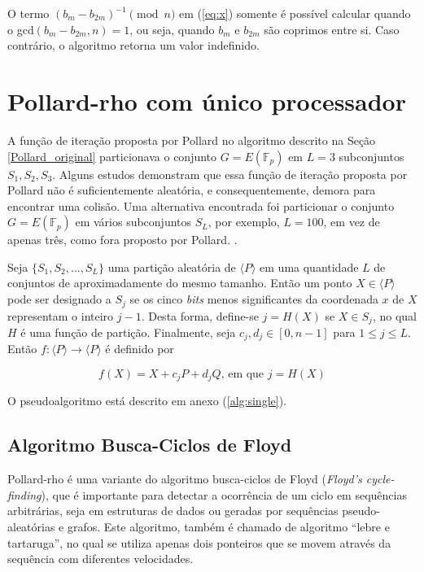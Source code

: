 O termo $(b_m - b_{2m})^{-1} \pmod n$ em (\ref{eq:x}) somente é possível calcular quando o gcd$(b_m - b_{2m}, n) = 1$, ou seja, quando \(b_m\) e \(b_{2m}\) são coprimos entre si. Caso contrário, o algoritmo retorna um valor indefinido.

%
%
\section{Pollard-rho com único processador} \label{sec:single}

A função de iteração proposta por Pollard no algoritmo descrito na Seção \ref{Pollard_original} particionava o conjunto $G = E(\mathbb{F}_p)$ em \(L = 3\) subconjuntos \(S_1, S_2, S_3\). Alguns estudos demonstram que essa função de iteração proposta por Pollard não é suficientemente aleatória, e consequentemente, demora para encontrar uma colisão. Uma alternativa encontrada foi particionar o conjunto $G = E(\mathbb{F}_p)$ em vários subconjuntos $S_L$, por exemplo, \(L = 100\), em vez de apenas três, como fora proposto por Pollard. \cite{Laporta:2014}.

Seja $\{S_1, S_2, ..., S_L\}$ uma partição aleatória de $\langle P \rangle$ em uma quantidade \(L\) de conjuntos de aproximadamente do mesmo tamanho. Então um ponto $X \in \langle P \rangle$ pode ser designado a \(S_j\) se os cinco \textit{bits} menos significantes da coordenada \(x\) de \(X\) representam o inteiro \(j-1\). Desta forma, define-se $j = H(X)$ se $X \in S_j$, no qual \(H\) é uma função de partição. Finalmente, seja $c_j, d_j \in [0, n-1]$ para $1 \leq j \leq L$. Então $f : \langle P \rangle \to  \langle P \rangle$ é definido por

\begin{equation*}
f(X) = X + c_jP + d_jQ \textrm{, em que } j = H(X)
\end{equation*}

O pseudoalgoritmo está descrito em anexo (\ref{alg:single}).

%
%
\subsection{Algoritmo Busca-Ciclos de Floyd} \label{floyd}
Pollard-rho é uma variante do algoritmo busca-ciclos de Floyd (\textit{Floyd's cycle-finding}), que é importante para detectar a ocorrência de um ciclo em sequências arbitrárias, seja em estruturas de dados ou geradas por sequências pseudo-aleatórias e grafos. Este algoritmo, também é chamado de algoritmo ``lebre e tartaruga'', no qual se utiliza apenas dois ponteiros que se movem através da sequência com diferentes velocidades.

